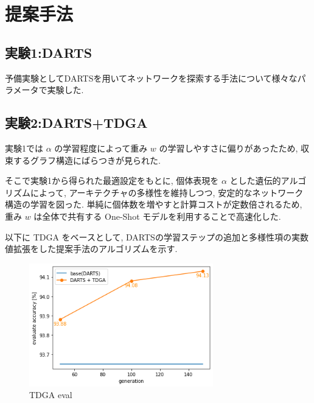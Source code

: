 \documentclass[a4paper,twoside,twocolumn,10pt]{article}
\begin{document}
\section{提案手法}
\subsection{実験1:DARTS}
予備実験としてDARTSを用いてネットワークを探索する手法について様々なパラメータで実験した.

\subsection{実験2:DARTS+TDGA}

実験1では $\alpha$ の学習程度によって重み $w$ の学習しやすさに偏りがあったため,
収束するグラフ構造にばらつきが見られた.

そこで実験1から得られた最適設定をもとに,
個体表現を $\alpha$ とした遺伝的アルゴリズムによって,
アーキテクチャの多様性を維持しつつ, 安定的なネットワーク構造の学習を図った.
単純に個体数を増やすと計算コストが定数倍されるため,
重み $w$ は全体で共有する One-Shot モデルを利用することで高速化した.

以下に TDGA をベースとして, DARTSの学習ステップの追加と多様性項の実数値拡張をした提案手法のアルゴリズムを示す.

\begin{figure}[t]
  \centering
  \includegraphics[width=80mm]{eval_tdga.png}
  \caption{TDGA eval}
  \label{fig:eval_tdga}
\end{figure}
\end{document}
